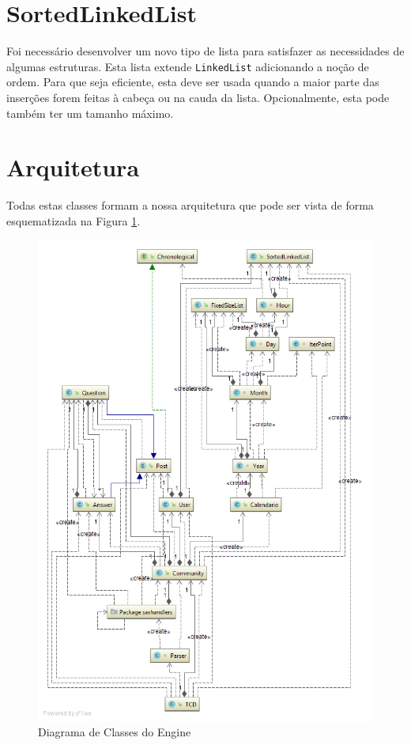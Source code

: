 \documentclass[10pt,a4paper]{report}
\begin{document}
    \section{SortedLinkedList}
    Foi necessário desenvolver um novo tipo de lista para satisfazer as
    necessidades de algumas estruturas.
    Esta lista extende \texttt{LinkedList} adicionando a noção de
    ordem. Para que seja eficiente, esta deve ser usada quando a maior parte
    das inserções forem feitas à cabeça ou na cauda da lista. Opcionalmente,
    esta pode também ter um tamanho máximo.

    \section{Arquitetura}
    Todas estas classes formam a nossa arquitetura que pode ser vista de forma
    esquematizada na Figura \ref{fig:fulldiagram}.

    \begin{figure}[h]
        \centering
        \includegraphics[width=\textwidth]{./images/FullDiagram.png}
        \caption{Diagrama de Classes do Engine}
        \label{fig:fulldiagram}
    \end{figure}
\end{document}
